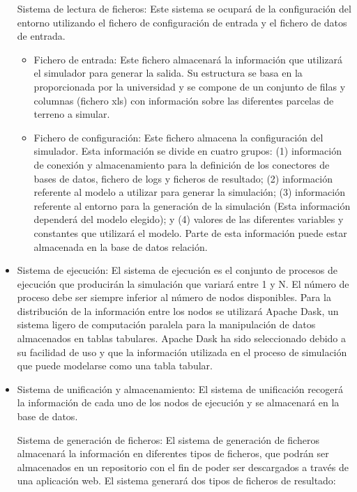 \documentclass{article}
\begin{document}
\begin{itemize}
\begin{item} Sistema de lectura de ficheros: Este sistema se ocupará de la configuración del entorno utilizando el fichero de configuración de entrada y el fichero de datos de entrada. 

\begin{itemize}

\item Fichero de entrada: Este fichero almacenará la información que utilizará el simulador para generar la salida. Su estructura se basa en la proporcionada por la universidad y se compone de un conjunto de filas y columnas (fichero xls) con información sobre las diferentes parcelas de terreno a simular. 

\item Fichero de configuración: Este fichero almacena la configuración del simulador. Esta información se divide en cuatro grupos: (1) información de conexión y almacenamiento para la definición de los conectores de bases de datos, fichero de logs y ficheros de resultado; (2) información referente al modelo a utilizar para generar la simulación; (3) información referente al entorno para la generación de la simulación (Esta información dependerá del modelo elegido); y (4) valores de las diferentes variables y constantes que utilizará el modelo. Parte de esta información puede estar almacenada en la base de datos relación.

\end{itemize}
\end{item}

\item Sistema de ejecución: El sistema de ejecución es el conjunto de procesos de ejecución que producirán la simulación que variará entre 1 y N. El número de proceso debe ser siempre inferior al número de nodos disponibles. Para la distribución de la información entre los nodos se utilizará Apache Dask, un sistema ligero de computación paralela para la manipulación de datos almacenados en tablas tabulares. Apache Dask ha sido seleccionado debido a su facilidad de uso y que la información utilizada en el proceso de simulación que puede modelarse como una tabla tabular. 

\item Sistema de unificación y almacenamiento: El sistema de unificación recogerá la información de cada uno de los nodos de ejecución y se almacenará en la base de datos. 

\begin{item} Sistema de generación de ficheros: El sistema de generación de ficheros almacenará la información en diferentes tipos de ficheros, que podrán ser almacenados en un repositorio con el fin de poder ser descargados a través de una aplicación web. El sistema generará dos tipos de ficheros de resultado:


\end{item}
\end{itemize}
\end{document}
